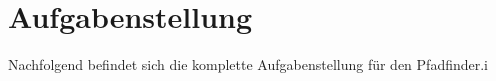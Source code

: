 \section{Aufgabenstellung} \label{aufgabenstellung}

Nachfolgend befindet sich die komplette Aufgabenstellung für den Pfadfinder.i

